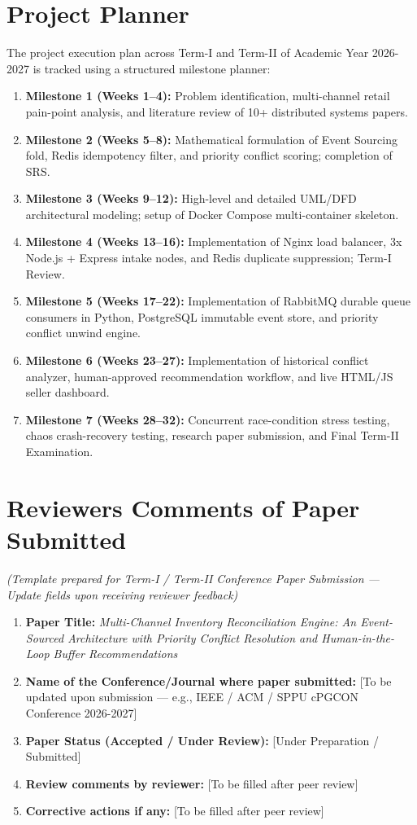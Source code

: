 \documentclass[oneside,a4paper,12pt]{report}
\newcommand{\AcademicYear}{2026-2027}
\begin{document}
\begin{appendices}
\chapter{Project Planner}
\label{app:plan}
The project execution plan across Term-I and Term-II of Academic Year \AcademicYear{} is tracked using a structured milestone planner:
\begin{enumerate}
  \item \textbf{Milestone 1 (Weeks 1--4):} Problem identification, multi-channel retail pain-point analysis, and literature review of 10+ distributed systems papers.
  \item \textbf{Milestone 2 (Weeks 5--8):} Mathematical formulation of Event Sourcing fold, Redis idempotency filter, and priority conflict scoring; completion of SRS.
  \item \textbf{Milestone 3 (Weeks 9--12):} High-level and detailed UML/DFD architectural modeling; setup of Docker Compose multi-container skeleton.
  \item \textbf{Milestone 4 (Weeks 13--16):} Implementation of Nginx load balancer, 3x Node.js + Express intake nodes, and Redis duplicate suppression; Term-I Review.
  \item \textbf{Milestone 5 (Weeks 17--22):} Implementation of RabbitMQ durable queue consumers in Python, PostgreSQL immutable event store, and priority conflict unwind engine.
  \item \textbf{Milestone 6 (Weeks 23--27):} Implementation of historical conflict analyzer, human-approved recommendation workflow, and live HTML/JS seller dashboard.
  \item \textbf{Milestone 7 (Weeks 28--32):} Concurrent race-condition stress testing, chaos crash-recovery testing, research paper submission, and Final Term-II Examination.
\end{enumerate}

\chapter{Reviewers Comments of Paper Submitted}
\textit{(Template prepared for Term-I / Term-II Conference Paper Submission — Update fields upon receiving reviewer feedback)}
\begin{enumerate}
  \item \textbf{Paper Title:} \textit{Multi-Channel Inventory Reconciliation Engine: An Event-Sourced Architecture with Priority Conflict Resolution and Human-in-the-Loop Buffer Recommendations}
  \item \textbf{Name of the Conference/Journal where paper submitted:} [To be updated upon submission — e.g., IEEE / ACM / SPPU cPGCON Conference \AcademicYear]
  \item \textbf{Paper Status (Accepted / Under Review):} [Under Preparation / Submitted]
  \item \textbf{Review comments by reviewer:} [To be filled after peer review]
  \item \textbf{Corrective actions if any:} [To be filled after peer review]
\end{enumerate}


\end{appendices}
\end{document}
